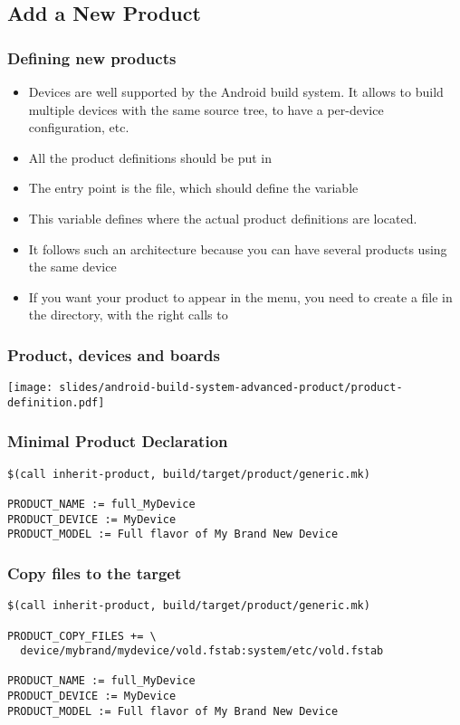 \subsection{Add a New Product}

\begin{frame}
  \frametitle{Defining new products}
  \begin{itemize}
  \item Devices are well supported by the Android build system. It allows
    to build multiple devices with the same source tree, to have a
    per-device configuration, etc.
  \item All the product definitions should be put in
  \item The entry point is the  file, which
    should define the  variable
  \item This variable defines where the actual product definitions are
    located.
  \item It follows such an architecture because you can have several
    products using the same device
  \item If you want your product to appear in the  menu, you need
    to create a  file in the  directory,
    with the right calls to 
  \end{itemize}
\end{frame}

\begin{frame}
  \frametitle{Product, devices and boards}
  \begin{center}
    \texttt{[image: slides/android-build-system-advanced-product/product-definition.pdf]}
  \end{center}
\end{frame}

\begin{frame}[fragile]
  \frametitle{Minimal Product Declaration}
\begin{verbatim}
$(call inherit-product, build/target/product/generic.mk)

PRODUCT_NAME := full_MyDevice
PRODUCT_DEVICE := MyDevice
PRODUCT_MODEL := Full flavor of My Brand New Device
\end{verbatim}
\end{frame}

\begin{frame}[fragile]
  \frametitle{Copy files to the target}
\begin{verbatim}
$(call inherit-product, build/target/product/generic.mk)

PRODUCT_COPY_FILES += \
  device/mybrand/mydevice/vold.fstab:system/etc/vold.fstab

PRODUCT_NAME := full_MyDevice
PRODUCT_DEVICE := MyDevice
PRODUCT_MODEL := Full flavor of My Brand New Device
\end{verbatim}
\end{frame}

